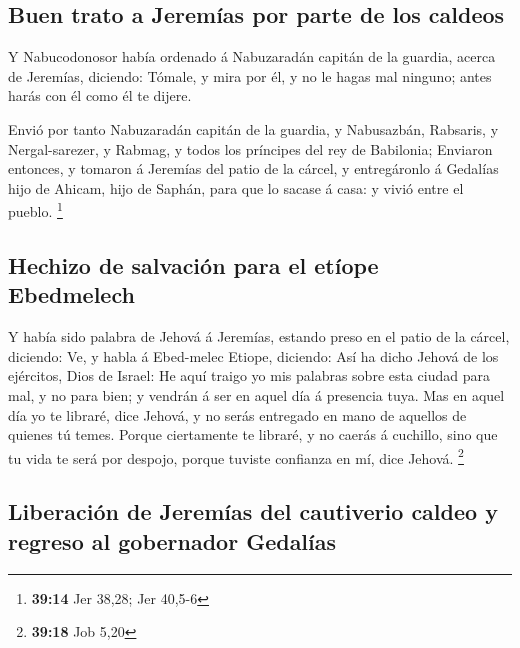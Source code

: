 \hypertarget{buen-trato-a-jeremuxedas-por-parte-de-los-caldeos}{%
\subsection{Buen trato a Jeremías por parte de los
caldeos}\label{buen-trato-a-jeremuxedas-por-parte-de-los-caldeos}}

 Y Nabucodonosor había ordenado á Nabuzaradán capitán de la
guardia, acerca de Jeremías, diciendo:  Tómale, y mira por
él, y no le hagas mal ninguno; antes harás con él como él te dijere.

 Envió por tanto Nabuzaradán capitán de la guardia, y
Nabusazbán, Rabsaris, y Nergal-sarezer, y Rabmag, y todos los príncipes
del rey de Babilonia;  Enviaron entonces, y tomaron á
Jeremías del patio de la cárcel, y entregáronlo á Gedalías hijo de
Ahicam, hijo de Saphán, para que lo sacase á casa: y vivió entre el
pueblo. \footnote{\textbf{39:14} Jer 38,28; Jer 40,5-6}

\hypertarget{hechizo-de-salvaciuxf3n-para-el-etuxedope-ebedmelech}{%
\subsection{Hechizo de salvación para el etíope
Ebedmelech}\label{hechizo-de-salvaciuxf3n-para-el-etuxedope-ebedmelech}}

 Y había sido palabra de Jehová á Jeremías, estando preso
en el patio de la cárcel, diciendo:  Ve, y habla á
Ebed-melec Etiope, diciendo: Así ha dicho Jehová de los ejércitos, Dios
de Israel: He aquí traigo yo mis palabras sobre esta ciudad para mal, y
no para bien; y vendrán á ser en aquel día á presencia tuya.
 Mas en aquel día yo te libraré, dice Jehová, y no serás
entregado en mano de aquellos de quienes tú temes.  Porque
ciertamente te libraré, y no caerás á cuchillo, sino que tu vida te será
por despojo, porque tuviste confianza en mí, dice Jehová. \footnote{\textbf{39:18}
  Job 5,20}

\hypertarget{liberaciuxf3n-de-jeremuxedas-del-cautiverio-caldeo-y-regreso-al-gobernador-gedaluxedas}{%
\subsection{Liberación de Jeremías del cautiverio caldeo y regreso al
gobernador
Gedalías}\label{liberaciuxf3n-de-jeremuxedas-del-cautiverio-caldeo-y-regreso-al-gobernador-gedaluxedas}}

